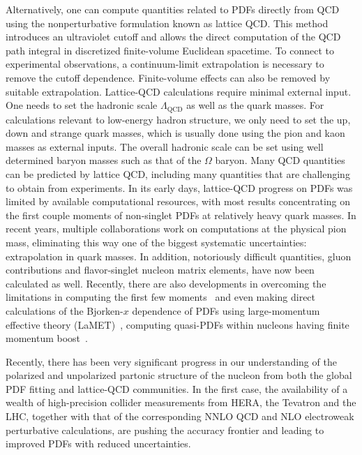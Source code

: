 Alternatively, one can compute quantities related to PDFs directly from QCD using the nonperturbative formulation known as lattice QCD.
This method introduces an ultraviolet cutoff and allows 
the direct computation of the QCD path integral in discretized 
  finite-volume Euclidean spacetime. To connect to experimental observations, a continuum-limit extrapolation is necessary to remove the cutoff dependence. Finite-volume effects can also be removed by suitable extrapolation.
%
Lattice-QCD calculations require minimal external input. One needs to set the hadronic scale $\Lambda_\text{QCD}$ as well as the quark masses. For calculations relevant to low-energy hadron structure, we only need to set the up, down and strange quark masses,
which is usually done using the pion and kaon masses as external inputs. 
The overall hadronic scale can be set using well determined baryon masses such as that of the $\Omega$ baryon. 
Many QCD quantities can be predicted by lattice QCD, including many quantities that are challenging to obtain from experiments. 
In its early days, lattice-QCD progress on PDFs was limited by available computational resources,
with most results concentrating on the first couple moments of non-singlet PDFs at relatively heavy quark masses. 
In recent years, multiple collaborations work on computations  at the physical pion mass, eliminating this way one of the biggest systematic uncertainties: extrapolation in quark masses. In addition, notoriously difficult quantities, gluon contributions and flavor-singlet nucleon matrix elements, have now been calculated as well. Recently, there are also developments in overcoming the limitations in computing the first few moments~\cite{Constantinou:2014tga,Syritsyn:2014saa,Lin:2012ev} and even making direct calculations of the Bjorken-$x$ dependence of PDFs using large-momentum effective theory (LaMET)~\cite{Ji:2014gla}, computing quasi-PDFs within nucleons having finite momentum boost~\cite{Lin:2014zya,Alexandrou:2015rja,Chen:2016utp,Alexandrou:2016jqi}.

Recently, there has been very significant progress in our understanding
of the polarized and unpolarized partonic structure of the nucleon from both
the global PDF fitting and lattice-QCD communities.
%
In the first case, the availability of a wealth of high-precision collider measurements
from HERA, the Tevatron and the LHC, together with that of the corresponding
NNLO QCD and NLO electroweak perturbative calculations, are pushing the
accuracy frontier and leading to improved PDFs with reduced uncertainties.

